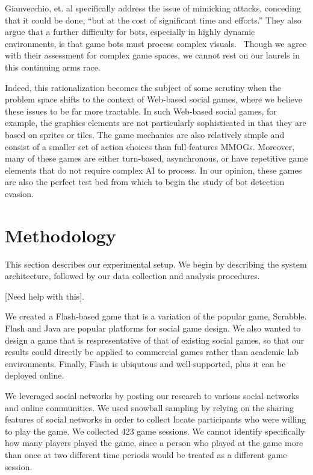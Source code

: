 \documentclass{acm_proc_article-sp}
\begin{document}
Gianvecchio, et. al specifically address the issue of mimicking attacks, conceding that it could be done, ``but at the cost of significant time and efforts.'' They also argue that a further difficulty for bots, especially in highly dynamic environments, is that game bots must process complex visuals.~\cite{botcraft} Though we agree with their assessment for complex game spaces, we cannot rest on our laurels in this continuing arms race.

Indeed, this rationalization becomes the subject of some scrutiny when the problem space shifts to the context of Web-based social games, where we believe these issues to be far more tractable. In such Web-based social games, for example, the graphics elements are not particularly sophisticated in that they are based on sprites or tiles. The game mechanics are also relatively simple and consist of a smaller set of action choices than full-features MMOGs. Moreover, many of these games are either turn-based, asynchronous, or have repetitive game elements that do not require complex AI to process. In our opinion, these games are also the perfect test bed from which to begin the study of bot detection evasion.

\section{Methodology}

This section describes our experimental setup. We begin by describing the system architecture, followed by our data collection and analysis procedures.

[Need help with this].

We created a Flash-based game that is a variation of the popular game, Scrabble. Flash and Java are popular platforms for social game design. We also wanted to design a game that is respresentative of that of existing social games, so that our results could directly be applied to commercial games rather than academic lab environments. Finally, Flash is ubiqutous and well-supported, plus it can be deployed online.

We leveraged social networks by posting our research to various social networks and online communities. We used snowball sampling by relying on the sharing features of social networks in order to collect locate participants who were willing to play the game. We collected 423 game sessions. We cannot identify specifically how many players played the game, since a person who played at the game more than once at two different time periods would be treated as a different game session.
\end{document}
